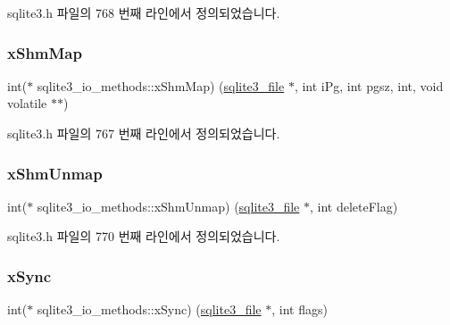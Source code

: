 sqlite3.\+h 파일의 768 번째 라인에서 정의되었습니다.

\mbox{\label{structsqlite3__io__methods_a2222efe012f210417f9881103014cdc5}} 
\subsubsection{\texorpdfstring{x\+Shm\+Map}{xShmMap}}
{\footnotesize\ttfamily int($\ast$ sqlite3\+\_\+io\+\_\+methods\+::x\+Shm\+Map) (\hyperlink{structsqlite3__file}{sqlite3\+\_\+file} $\ast$, int i\+Pg, int pgsz, int, void volatile $\ast$$\ast$)}



sqlite3.\+h 파일의 767 번째 라인에서 정의되었습니다.

\mbox{\label{structsqlite3__io__methods_a494ae8bbfe91c38598c73aaa18f1848f}} 
\subsubsection{\texorpdfstring{x\+Shm\+Unmap}{xShmUnmap}}
{\footnotesize\ttfamily int($\ast$ sqlite3\+\_\+io\+\_\+methods\+::x\+Shm\+Unmap) (\hyperlink{structsqlite3__file}{sqlite3\+\_\+file} $\ast$, int delete\+Flag)}



sqlite3.\+h 파일의 770 번째 라인에서 정의되었습니다.

\mbox{\label{structsqlite3__io__methods_ad4b78f6b0b475e621fe29fb1cc886437}} 
\subsubsection{\texorpdfstring{x\+Sync}{xSync}}
{\footnotesize\ttfamily int($\ast$ sqlite3\+\_\+io\+\_\+methods\+::x\+Sync) (\hyperlink{structsqlite3__file}{sqlite3\+\_\+file} $\ast$, int flags)}



